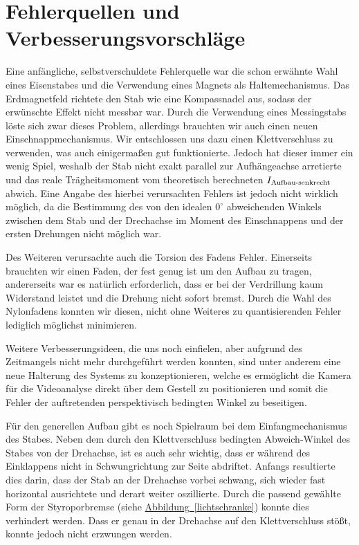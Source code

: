 \documentclass[halfparskip, 11pt]{scrartcl}
\newcommand{\hypref}[2]{\hyperref[#2]{{#1}~\ref{#2}}}
\begin{document}
\FloatBarrier
\section{Fehlerquellen und Verbesserungsvorschläge}\label{sec:verbesserung}
Eine anfängliche, selbstverschuldete Fehlerquelle war die schon erwähnte Wahl eines Eisenstabes und die Verwendung eines Magnets als Haltemechanismus. Das Erdmagnetfeld richtete den Stab wie eine Kompassnadel aus, sodass der erwünschte Effekt nicht messbar war. Durch die Verwendung eines Messingstabs löste sich zwar dieses Problem, allerdings brauchten wir auch einen neuen Einschnappmechanismus. Wir entschlossen uns dazu einen Klettverschluss zu verwenden, was auch einigermaßen gut funktionierte. Jedoch hat dieser immer ein wenig Spiel, weshalb der Stab nicht exakt parallel zur Aufhängeachse arretierte und das reale Trägheitsmoment vom theoretisch berechneten $I_{\textnormal{Aufbau-senkrecht}}$ abwich. Eine Angabe des hierbei verursachten Fehlers ist jedoch nicht wirklich möglich, da die Bestimmung des von den idealen $0^\circ$ abweichenden Winkels zwischen dem Stab und der Drechachse im Moment des Einschnappens und der ersten Drehungen nicht möglich war.

Des Weiteren verursachte auch die Torsion des Fadens Fehler. Einerseits brauchten wir einen Faden, der fest genug ist um den Aufbau zu tragen, andererseits war es natürlich erforderlich, dass er bei der Verdrillung kaum Widerstand leistet und die Drehung nicht sofort bremst. Durch die Wahl des Nylonfadens konnten wir diesen, nicht ohne Weiteres zu quantisierenden Fehler lediglich möglichst minimieren.

Weitere Verbesserungsideen, die uns noch einfielen, aber aufgrund des Zeitmangels nicht mehr durchgeführt werden konnten, sind unter anderem eine neue Halterung des Systems zu konzeptionieren, welche es ermöglicht die Kamera für die Videoanalyse direkt über dem Gestell zu positionieren und somit die Fehler der auftretenden perspektivisch bedingten Winkel zu beseitigen.

Für den generellen Aufbau gibt es noch Spielraum bei dem Einfangmechanismus des Stabes. Neben dem durch den Klettverschluss bedingten Abweich-Winkel des Stabes von der Drehachse, ist es auch sehr wichtig, dass er während des Einklappens nicht in Schwungrichtung zur Seite abdriftet. Anfangs resultierte dies darin, dass der Stab an der Drehachse vorbei schwang, sich wieder fast horizontal ausrichtete und derart weiter oszillierte. Durch die passend gewählte Form der Styroporbremse (siehe \hypref{Abbildung}{lichtschranke}) konnte dies verhindert werden. Dass er genau in der Drehachse auf den Klettverschluss stößt, konnte jedoch nicht erzwungen werden.
\end{document}
